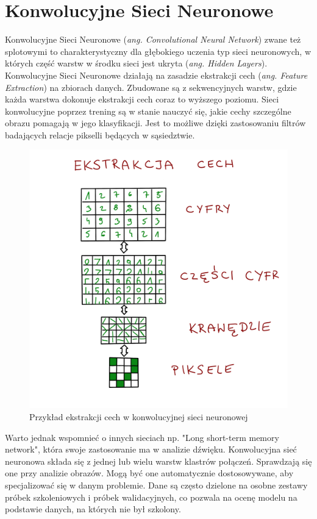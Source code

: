 \documentclass[openright]{xmgr}
\begin{document}
\section{Konwolucyjne Sieci Neuronowe  \label{s:dsssl}}


\indent \indent Konwolucyjne Sieci Neuronowe (\textit{ang. Convolutional Neural Network}) zwane też splotowymi to charakterystyczny dla głębokiego uczenia typ sieci neuronowych, w których część warstw w środku sieci jest ukryta (\textit{ang. Hidden Layers}). Konwolucyjne Sieci Neuronowe działają na zasadzie ekstrakcji cech (\textit{ang. Feature Extraction}) na zbiorach danych. Zbudowane są z sekwencyjnych warstw, gdzie każda warstwa dokonuje ekstrakcji cech coraz to wyższego poziomu.
Sieci konwolucyjne poprzez trening są w stanie nauczyć się, jakie cechy szczególne obrazu pomagają w jego klasyfikacji. Jest to możliwe dzięki zastosowaniu filtrów badających relacje pikselli będących w sąsiedztwie. 




\begin{figure}[!tbh]
\centering
\includegraphics[width=.8\hsize]{fig/10}
\caption{Przykład ekstrakcji cech w konwolucyjnej sieci neuronowej\label{RYS.2}}
\end{figure}

Warto jednak wspomnieć o innych sieciach np. "Long short-term memory network", która swoje zastosowanie ma w analizie dźwięku. Konwolucyjna sieć neuronowa składa się z jednej lub wielu warstw klastrów połączeń. Sprawdzają się one przy analizie obrazów.  Mogą być one automatycznie dostosowywane, aby specjalizować się w danym problemie. Dane są często dzielone na osobne zestawy próbek szkoleniowych i próbek walidacyjnych, co pozwala na ocenę modelu na podstawie danych, na których nie był szkolony.
\end{document}
